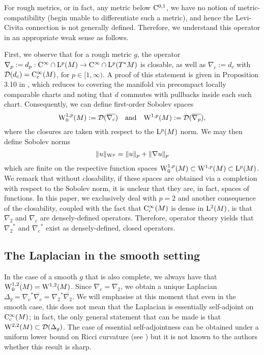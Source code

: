\documentclass[a4paper, 12pt]{amsart}
\numberwithin{equation}{section}
\renewcommand{\~}{\tilde}
\renewcommand{\-}{\bar}
\newcommand{\8}{\infty}
\newcommand{\dom}{ {\mathcal{D}}}
\newcommand{\close}[1]{\overline{#1}}		%
\newcommand{\adj}[1]{{#1}^\ast}			%
\newcommand{\Lp}[2][{}]{{\rm L}^{#2}_{\rm #1}}		%
\newcommand{\Ck}[2][{}]{{\rm C}^{#2}_{\rm #1}}		%
\newcommand{\Sob}[2][{}]{{\rm W}^{#2}_{\rm #1}}		%
\newcommand{\SobH}[2][{}]{{\Sob[#1]{#2,2}}}	%
\begin{document}
For rough metrics, or in fact, any metric below $\Ck{0,1}$, we have no notion of metric-compatibility (begin unable to differentiate such a metric), and hence the Levi-Civita connection is not generally defined. Therefore, we understand this operator in an appropriate weak sense as follows. 

First, we observe that for a rough metric $g$, the operator
$\nabla_p := d_p: \Ck{\infty} \cap \Lp{p}(M) \to \Ck{\infty} \cap \Lp{p}(T^\ast M)$
is closable, as well as $\nabla_c := d_c$ with $\dom(d_c) = \Ck[c]{\infty}(M)$,
for $p \in [1, \infty)$. A proof of this statement is given in Proposition 3.10 in \cite{BRough}, 
which reduces to covering the manifold via precompact locally comparable
charts and noting that $d$ commutes with pullbacks inside each such chart.
Consequently, we can define first-order Sobolev spaces
\[
\Sob[0]{1,p}(M) := \dom(\overline{\nabla_c})\quad \text{and}\quad  \Sob{1,p}(M) := \dom(\overline{\nabla_p}),
\]
where the closures are taken with respect to the \(\Lp{p}(M)\) norm. We may then define Sobolev norms
\[
\|u\|_{\Sob{p}} = \|u\|_p + \|\nabla u\|_p
\]
which are finite on the respective function spaces $\Sob[0]{1,p}(M) \subset \Sob{1,p}(M) \subset \Lp{p}(M)$. We remark that without closability, if these spaces are obtained via a completion with respect to the Sobolev norm, it is unclear that they are, in fact, spaces of functions. In this paper, we exclusively deal with \(p = 2\) and another consequence of the closability, coupled with the 
fact that $\Ck[c]{\infty}(M)$ is dense in $\Lp{2}(M)$,
is that $\nabla_2$ and $\nabla_c$ are densely-defined
operators. Therefore, operator theory yields 
that $\adj{\nabla_2}$ and $\adj{\nabla_c}$ exist
as densely-defined, closed operators.

\subsection{The Laplacian in the smooth setting}

In the case of a smooth $g$ that is also complete, we
always have that $\SobH[0]{1}(M) = \SobH{1}(M)$. 
Since $\nabla_c = \nabla_2$, we obtain 
a unique Laplacian $\Delta_g = \adj{\nabla_c} \close{\nabla_c} = \adj{\nabla_2}\close{\nabla_2}$.
We will emphasise at this moment that even in the smooth case, this does not mean that the Laplacian is essentially self-adjoint on $\Ck[c]{\infty}(M)$; in fact, the only general statement that can be made is that
$\SobH{2}(M) \subset \dom(\Delta_g)$. The 
case of essential self-adjointness can
be obtained under a uniform lower bound on Ricci
curvature (see \cite{BDensity}) but it
is not known to the authors whether this result is sharp.
\end{document}

